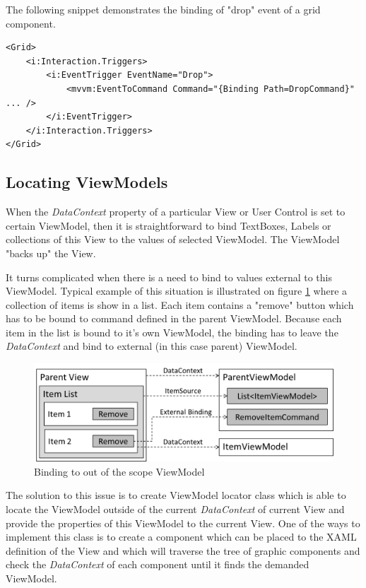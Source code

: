 The following snippet demonstrates the binding of "drop" event of a grid component.

\begin{verbatim}
<Grid>
	<i:Interaction.Triggers>
	    <i:EventTrigger EventName="Drop">
	        <mvvm:EventToCommand Command="{Binding Path=DropCommand}" ... />
	    </i:EventTrigger>
	</i:Interaction.Triggers>
</Grid>
\end{verbatim}

\subsection{Locating ViewModels}
When the \textit{DataContext} property of a particular View or User Control is set to certain ViewModel, then it is straightforward to bind TextBoxes, Labels or collections of this View to the values of selected ViewModel. The ViewModel "backs up" the View.

It turns complicated when there is a need to bind to values external to this ViewModel. Typical example of this situation is illustrated on figure \ref{fig:mvvm_locator} where a collection of items is show in a list. Each item contains a "remove" button which has to be bound to command defined in the parent ViewModel. Because each item in the list is bound to it's own ViewModel, the binding has to leave the \textit{DataContext} and bind to external (in this case parent) ViewModel.

\begin{figure}[h]
\begin{center}
\includegraphics[width=14cm]{figures/mvvm_locator}
\caption{Binding to out of the scope ViewModel}
\label{fig:mvvm_locator}
\end{center}
\end{figure}

The solution to this issue is to create ViewModel locator class which is able to locate the ViewModel outside of the current \textit{DataContext} of current View and provide the properties of this ViewModel to the current View. One of the ways to implement this class is to create a component which can be placed to the XAML definition of the View and which will traverse the tree of graphic components and check the \textit{DataContext} of each component until it finds the demanded ViewModel.


